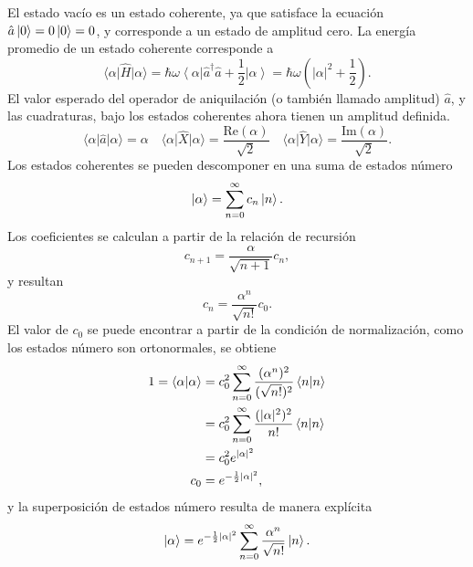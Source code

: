 El estado vacío es un estado coherente, ya que satisface la ecuación $\hat{a} \ket{0} = 0 \ket{0} = 0$, y corresponde a un estado de amplitud cero. La energía promedio de un estado coherente corresponde a
\begin{equation*}
  \langle \alpha \vert \hat{H}\vert \alpha \rangle = \hbar\omega \left\langle \alpha \right\vert \hat{a}^{\dagger}\hat{a} + \frac{1}{2} \left\vert \alpha \right\rangle = \hbar\omega \left(|\alpha|^2 + \frac{1}{2} \right).
\end{equation*}
El valor esperado del operador de aniquilación (o también llamado amplitud) $\hat{a}$, y las cuadraturas, bajo los estados coherentes ahora tienen un amplitud definida.
\begin{equation*}
  \langle \alpha \vert \hat{a} \vert\alpha \rangle = \alpha \quad \langle \alpha \vert \hat{X} \vert \alpha \rangle = \frac{\mathrm{Re}(\alpha)}{\sqrt{2}} \quad \langle \alpha \vert \hat{Y} \vert \alpha\rangle = \frac{\mathrm{Im}(\alpha)}{\sqrt{2}}.
\end{equation*}
Los estados coherentes se pueden descomponer en una suma de estados número
\begin{equation*}
  \ket{\alpha} = \sum_{n=0}^{\infty} c_n \ket{n}.
\end{equation*}
Los coeficientes se calculan a partir de la relación de recursión
\begin{equation*}
  c_{n+1} = \frac{\alpha}{\sqrt{n+1}}c_n,
\end{equation*}
y resultan
\begin{equation*}
  c_n = \frac{\alpha^n }{\sqrt{n!}}c_0.
\end{equation*}
El valor de $c_0$ se puede encontrar a partir de la condición de normalización, como los estados número son ortonormales, se obtiene
\begin{align*}
  1 = \braket{\alpha}{\alpha} & = c_0^2 \sum_{n=0}^{\infty} \frac{(\alpha^n)^2}{(\sqrt{n!})^2}\braket{n}{n} \\ &= c_0^2  \sum_{n=0}^{\infty} \frac{(|\alpha|^2)^2}{n!}\braket{n}{n}\\ &= c_0^2 e^{|\alpha|^2} \\
  c_0                         & = e^{-\frac{1}{2}|\alpha|^2},
\end{align*}
y la superposición de estados número resulta de manera explícita
\begin{equation*}
  \ket{\alpha} = e^{-\frac{1}{2}|\alpha|^2} \sum_{n=0}^{\infty} \frac{\alpha^n}{\sqrt{n!}}\ket{n}.
\end{equation*}

